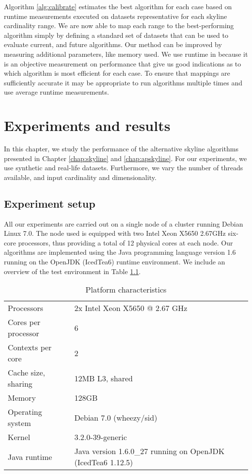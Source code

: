 \documentclass[12pt,a4paper,twoside]{report}
\begin{document}
Algorithm \ref{alg:calibrate} estimates the best algorithm for each
case based on runtime measurements executed on datasets representative
for each skyline cardinality range. We are now able to map each range
to the best-performing algorithm simply by defining a standard set
of datasets that can be used to evaluate current, and future
algorithms. Our method can be improved by measuring additional
parameters, like memory used. We use runtime in because it is an
objective measurement on performance that give us good indications
as to which algorithm is most efficient for each case. To ensure
that mappings are sufficiently accurate it may be appropriate to
run algorithms multiple times and use average runtime
measurements.

\cleardoublepage
\chapter{Experiments and results}

In this chapter, we study the performance of the alternative
skyline algorithms presented in Chapter \ref{chap:skyline} and
\ref{chap:apskyline}. For our experiments, we use synthetic and
real-life datasets. Furthermore, we vary the number of threads
available, and input cardinality and dimensionality.

\section{Experiment setup}

All our experiments are carried out on a single node of a
cluster running Debian Linux 7.0. The node used is equipped
with two Intel Xeon X5650 2.67GHz six-core processors, thus
providing a total of 12 physical cores at each node. Our
algorithms are implemented using the Java programming language
version 1.6 running on the OpenJDK (IcedTea6) runtime
environment. We include an overview of the test environment in
Table \ref{tab:environment}.

\begin{table}[H]
	\centering
	\begin{tabular}{ll}
	\hline
	Processors & 2x Intel Xeon X5650 @ 2.67 GHz \\
	Cores per processor & 6 \\
	Contexts per core & 2 \\
	Cache size, sharing & 12MB L3, shared \\
	Memory & 128GB \\
	Operating system & Debian 7.0 (wheezy/sid) \\
	Kernel & 3.2.0-39-generic \\
	Java runtime & Java version 1.6.0\_27 running on OpenJDK (IcedTea6 1.12.5) \\
	\hline
	\end{tabular}
	\caption{Platform characteristics}
	\label{tab:environment}
\end{table}
\end{document}
